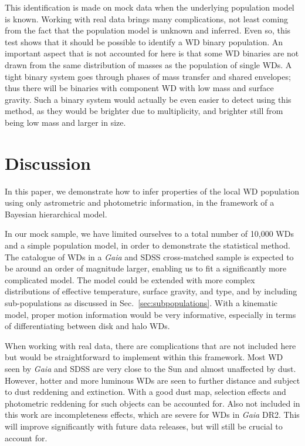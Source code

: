 \documentclass[fleqn,usenatbib]{mnras}
\begin{document}
This identification is made on mock data when the underlying population model is known. Working with real data brings many complications, not least coming from the fact that the population model is unknown and inferred. Even so, this test shows that it should be possible to identify a WD binary population. An important aspect that is not accounted for here is that some WD binaries are not drawn from the same distribution of masses as the population of single WDs. A tight binary system goes through phases of mass transfer and shared envelopes; thus there will be binaries with component WD with low mass and surface gravity. Such a binary system would actually be even easier to detect using this method, as they would be brighter due to multiplicity, and brighter still from being low mass and larger in size.







\section{Discussion}\label{sec:discussion}

In this paper, we demonstrate how to infer properties of the local WD population using only astrometric and photometric information, in the framework of a Bayesian hierarchical model.

In our mock sample, we have limited ourselves to a total number of 10,000 WDs and a simple population model, in order to demonstrate the statistical method. The catalogue of WDs in a \emph{Gaia} and SDSS cross-matched sample is expected to be around an order of magnitude larger, enabling us to fit a significantly more complicated model. The model could be extended with more complex distributions of effective temperature, surface gravity, and type, and by including sub-populations as discussed in Sec.~\ref{sec:subpopulations}. With a kinematic model, proper motion information would be very informative, especially in terms of differentiating between disk and halo WDs.

When working with real data, there are complications that are not included here but would be straightforward to implement within this framework. Most WD seen by \emph{Gaia} and SDSS are very close to the Sun and almost unaffected by dust. However, hotter and more luminous WDs are seen to further distance and subject to dust reddening and extinction. With a good dust map, selection effects and photometric reddening for such objects can be accounted for. Also not included in this work are incompleteness effects, which are severe for WDs in \emph{Gaia} DR2. This will improve significantly with future data releases, but will still be crucial to account for.
\end{document}
